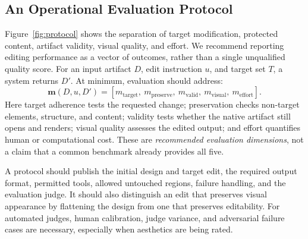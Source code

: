 \subsection{An Operational Evaluation Protocol}
Figure~\ref{fig:protocol} shows the separation of target modification, protected content, artifact validity, visual quality, and effort.
We recommend reporting editing performance as a vector of outcomes, rather than a single unqualified quality score. For an input artifact $D$, edit instruction $u$, and target set $T$, a system returns $D'$. At minimum, evaluation should address:
\begin{equation}
\mathbf{m}(D,u,D') =
\left[
m_{\mathrm{target}},\
m_{\mathrm{preserve}},\
m_{\mathrm{valid}},\
m_{\mathrm{visual}},\
m_{\mathrm{effort}}
\right].
\label{eq:metrics}
\end{equation}
Here target adherence tests the requested change; preservation checks non-target elements, structure, and content; validity tests whether the native artifact still opens and renders; visual quality assesses the edited output; and effort quantifies human or computational cost. These are \emph{recommended evaluation dimensions}, not a claim that a common benchmark already provides all five.

A protocol should publish the initial design and target edit, the required output format, permitted tools, allowed untouched regions, failure handling, and the evaluation judge. It should also distinguish an edit that preserves visual appearance by flattening the design from one that preserves editability. For automated judges, human calibration, judge variance, and adversarial failure cases are necessary, especially when aesthetics are being rated.
